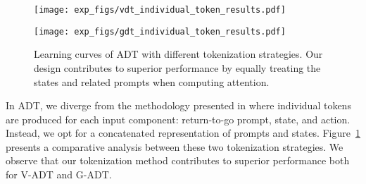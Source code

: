 \begin{figure}[!htbp]
\centering
\begin{minipage}[t]{1\textwidth}
\centering
\texttt{[image: exp\_figs/vdt\_individual\_token\_results.pdf]}
\end{minipage}
\begin{minipage}[t]{1\textwidth}
\centering
\texttt{[image: exp\_figs/gdt\_individual\_token\_results.pdf]}
\end{minipage}
\caption{Learning curves of ADT with different tokenization strategies. Our design contributes to superior performance by equally treating the states and related prompts when computing attention.}
\label{fig:token_ablation}
\end{figure}



In ADT, we diverge from the methodology presented in \citep{chen2021decision} where individual tokens are produced for each input component: return-to-go prompt, state, and action. Instead, we opt for a concatenated representation of prompts and states. Figure~\ref{fig:token_ablation} presents a comparative analysis between these two tokenization strategies. 
We observe that our tokenization method contributes to superior performance both for V-ADT and G-ADT. 

